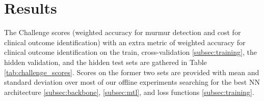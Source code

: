 \section{Results}
\label{sec:results}

The Challenge scores (weighted accuracy for murmur detection and cost for clinical outcome identification) with an extra metric of weighted accuracy for clinical outcome identification on the train, cross-validation \ref{subsec:training}, the hidden validation, and the hidden test sets are gathered in Table \ref{tab:challenge_scores}. Scores on the former two sets are provided with mean and standard deviation over most of our offline experiments searching for the best NN architecture \ref{subsec:backbone}, \ref{subsec:mtl}, and loss functions \ref{subsec:training}.


